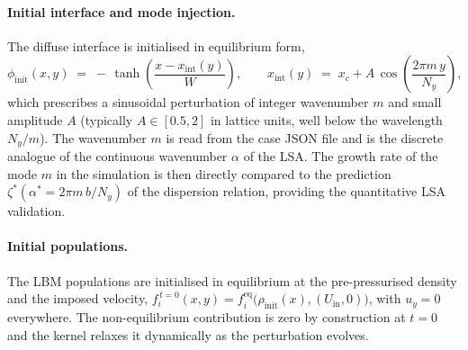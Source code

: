 \paragraph{Initial interface and mode injection.}
The diffuse interface is initialised in equilibrium form,
\begin{equation}
\phi_{\mathrm{init}}(x, y) \;=\; -\,\tanh\!\left(\frac{x - x_{\mathrm{int}}(y)}{W}\right),
\qquad
x_{\mathrm{int}}(y) \;=\; x_c + A\,\cos\!\left(\frac{2\pi m\,y}{N_y}\right),
\label{eq:phi-init}
\end{equation}
which prescribes a sinusoidal perturbation of integer wavenumber $m$ and small amplitude $A$ (typically $A \in [0.5, 2]$ in lattice units, well below the wavelength $N_y/m$).
The wavenumber $m$ is read from the case JSON file and is the discrete analogue of the continuous wavenumber $\alpha$ of the LSA.
The growth rate of the mode $m$ in the simulation is then directly compared to the prediction $\zeta^{*}(\alpha^{*} = 2\pi m\,b/N_y)$ of the dispersion relation, providing the quantitative LSA validation.

\paragraph{Initial populations.}
The LBM populations are initialised in equilibrium at the pre-pressurised density and the imposed velocity, $f_i^{\,t=0}(x, y) = f_i^{\mathrm{eq}}\bigl(\rho_{\mathrm{init}}(x), (U_{\mathrm{in}}, 0)\bigr)$, with $u_y = 0$ everywhere.
The non-equilibrium contribution is zero by construction at $t = 0$ and the kernel relaxes it dynamically as the perturbation evolves.

